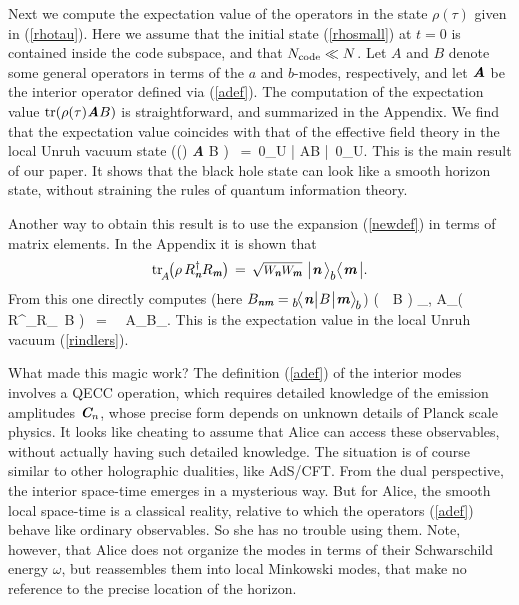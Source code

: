 \documentclass[12pt]{article}%
\def\spc{\hspace{.5pt}}
\def\be{\begin{equation}}
\def\ee{\end{equation}}
\begin{document}
Next we compute the expectation value of the operators in the state $\rho(\tau)$ given in (\ref{rhotau}). Here we assume that the
initial state (\ref{rhosmall}) at $t=0$ is contained inside the code subspace, and that ${N_{\rm code}}\ll N$.
 Let $A$ and $B$ denote some general operators in terms of the $a$ and $b$-modes, respectively, and let $\textit{\textbf A}$ be the interior operator
 defined via (\ref{adef}). The computation of the expectation value ${\rm tr}(\rho(\tau) \textit{\textbf A} B)$ is straightforward, and summarized in the Appendix. 
 We find that the expectation value coincides with that of the effective field theory in the local Unruh vacuum state
\bea
\label{unruhvev}
\tr\bigr(\rho(\tau) \spc  \textit{\textbf A} B \bigr) \, =\,  
\la \spc 0_{\spc U} \bigr| A\spc B \bigl|\, 0_{\spc U}\ra .
\eea  
This is the main result of our paper. It shows that the black hole state can look like a smooth horizon state, without straining the rules of quantum information theory.


Another way to obtain this result is to use the expansion (\ref{newdef}) in terms of matrix elements. In the Appendix it is shown that
\be
\label{rhobb}
 \tr_\aaA\! \bigl(\rho \, R^\dag_\nom R_\mom \bigr) \, =\,  \sqrt{\pp_\nom \pp_\mom }\, \, \bigl|\spc \nom \, \ra_\bbbb \la\spc \mom \, \bigr|  .
\ee 
From this one directly computes  (here $B_{\nom\mom} =  {}_\bbbb\!\smpc\la \spc \nom \spc  \bigl| \spc B\spc \bigl| \spc \mom\spc  \ra_{\!\smpc \bbbb}$)
\bea
\label{rindelrv}
\tr \bigll(\rho \, \bfA \, B \bigrr) \is \sum_{\nom,\mom} A_\nm \tr\bigll(\rho \, R^\dag_\nom R_\mom  \, B \bigrr) \, = \, \sqrt{\pp_\nom \pp_\mom}\,  A_\nm B_\nm.
\eea
This is the expectation value in the local Unruh vacuum (\ref{rindlers}).

What made this magic work? The definition (\ref{adef}) of the interior modes involves a QECC operation, which requires
detailed knowledge of the emission amplitudes $\mbox{\textit{\textbf{C}\!\,}}_n$, whose precise form depends on unknown details of 
 Planck scale physics. It looks like cheating to assume that Alice can access these observables,
 without actually having such detailed knowledge. The situation is of course similar to other
 holographic dualities, like AdS/CFT.  From the dual perspective, the interior space-time emerges in a mysterious way. But for Alice, 
 the smooth local space-time is a classical reality, relative to which the operators (\ref{adef}) behave like ordinary observables.
  So she has no trouble using them.  Note, however, that Alice  does  not organize the modes in terms of their Schwarschild energy $\omega$,
 but  reassembles them into local Minkowski modes, that make no reference to the precise location of the horizon.
\end{document}
